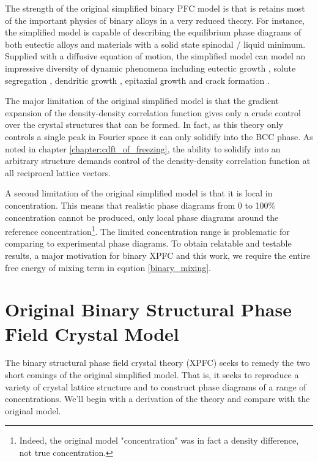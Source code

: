 The strength of the original simplified binary PFC model is that is retains
most of the important physics of binary alloys in a very reduced theory. For
instance, the simplified model is capable of describing the equilibrium phase
diagrams of both eutectic alloys and materials with a solid state spinodal /
liquid minimum.  Supplied with a diffusive equation of motion, the simplified
model can model an impressive diversity of dynamic phenomena including eutectic
growth \cite{ELDER07}, solute segregation \cite{STOLLE14}, dendritic growth
\cite{ELDER07}, epitaxial growth \cite{ELDER10_NANOISLAND, LU16} and crack
formation \cite{HU17}.

The major limitation of the original simplified model is that the gradient
expansion of the density-density correlation function gives only a crude
control over the crystal structures that can be formed. In fact, as this theory only
controls a single peak in Fourier space it can only solidify into the BCC
phase. As noted in chapter \ref{chapter:cdft_of_freezing}, the ability to
solidify into an arbitrary structure demands control of the
density-density correlation function at all reciprocal lattice vectors.

A second limitation of the original simplified model is that it is local in
concentration. This means that realistic phase diagrams from 0 to 100\%
concentration cannot be produced, only local phase diagrams around the
reference concentration\footnote{Indeed, the original model "concentration" was
in fact a density difference, not true concentration.}. The limited
concentration range is problematic for comparing to experimental phase
diagrams. To obtain relatable and testable results, a major motivation for
binary XPFC and this work, we require the entire free energy of mixing term in
eqution \ref{binary_mixing}.

\section{Original Binary Structural Phase Field Crystal Model} %

The binary structural phase field crystal theory (XPFC) seeks to remedy the two
short comings of the original simplified model. That is, it seeks to reproduce
a variety of crystal lattice structure and to construct  phase diagrams of a
range of concentrations. We'll begin with a derivation of the theory and
compare with the original model.

